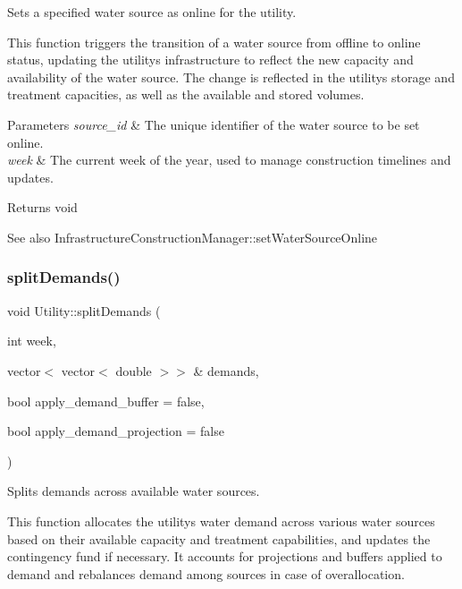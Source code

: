 Sets a specified water source as online for the utility. 

This function triggers the transition of a water source from offline to online status, updating the utility\textquotesingle{}s infrastructure to reflect the new capacity and availability of the water source. The change is reflected in the utility\textquotesingle{}s storage and treatment capacities, as well as the available and stored volumes.


\begin{DoxyParams}{Parameters}
{\em source\+\_\+id} & The unique identifier of the water source to be set online. \\
\hline
{\em week} & The current week of the year, used to manage construction timelines and updates.\\
\hline
\end{DoxyParams}
\begin{DoxyReturn}{Returns}
void
\end{DoxyReturn}
\begin{DoxySeeAlso}{See also}
Infrastructure\+Construction\+Manager\+::set\+Water\+Source\+Online 
\end{DoxySeeAlso}
\mbox{\label{classUtility_aca42b14087c3184d4fec10a2e8729c05}} 
\subsubsection{\texorpdfstring{split\+Demands()}{splitDemands()}}
{\footnotesize\ttfamily void Utility\+::split\+Demands (\begin{DoxyParamCaption}\item[{int}]{week,  }\item[{vector$<$ vector$<$ double $>$$>$ \&}]{demands,  }\item[{bool}]{apply\+\_\+demand\+\_\+buffer = {\ttfamily false},  }\item[{bool}]{apply\+\_\+demand\+\_\+projection = {\ttfamily false} }\end{DoxyParamCaption})}



Splits demands across available water sources. 

This function allocates the utility\textquotesingle{}s water demand across various water sources based on their available capacity and treatment capabilities, and updates the contingency fund if necessary. It accounts for projections and buffers applied to demand and rebalances demand among sources in case of overallocation.

